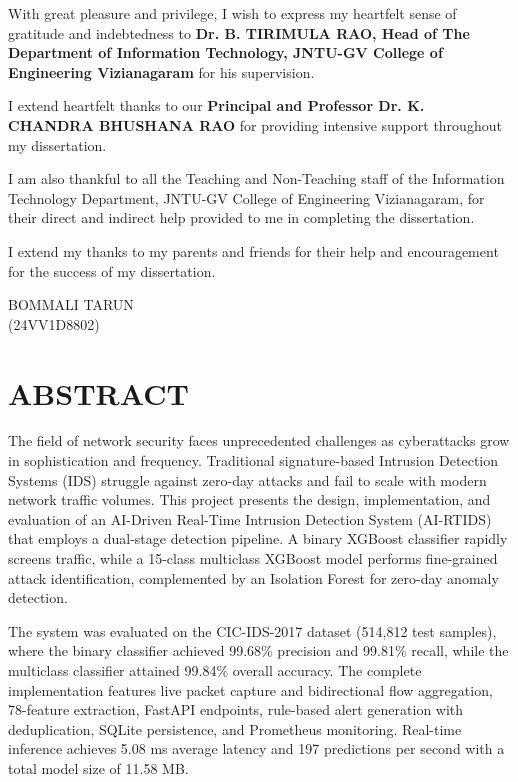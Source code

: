 \documentclass[12pt,a4paper]{report}
\newcommand{\centeredchapter}[1]{%
  \bgroup
  \titleformat{\chapter}[display]{\bfseries\Large\centering}{}{0pt}{\Large}%
  \chapter*{#1}%
  \egroup
}
\begin{document}
With great pleasure and privilege, I wish to express my heartfelt
sense of gratitude and indebtedness to
\textbf{Dr. B. TIRIMULA RAO, Head of The
Department of Information Technology, JNTU-GV College of Engineering
Vizianagaram} for his supervision.

I extend heartfelt thanks to our \textbf{Principal and Professor
Dr. K. CHANDRA BHUSHANA RAO} for providing intensive support throughout
my dissertation.

I am also thankful to all the Teaching and Non-Teaching staff of the
Information Technology Department, JNTU-GV College of Engineering
Vizianagaram, for their direct and indirect help provided to me in
completing the dissertation.

I extend my thanks to my parents and friends for their help and
encouragement for the success of my dissertation.

\vspace{0.05in}
\begin{flushright}
BOMMALI TARUN\\[0.5em]
(24VV1D8802)
\end{flushright}

\newpage
\centeredchapter{ABSTRACT}
\justifying

The field of network security faces unprecedented challenges as cyberattacks grow in sophistication and frequency. Traditional signature-based Intrusion Detection Systems (IDS) struggle against zero-day attacks and fail to scale with modern network traffic volumes. This project presents the design, implementation, and evaluation of an AI-Driven Real-Time Intrusion Detection System (AI-RTIDS) that employs a dual-stage detection pipeline. A binary XGBoost classifier rapidly screens traffic, while a 15-class multiclass XGBoost model performs fine-grained attack identification, complemented by an Isolation Forest for zero-day anomaly detection.

The system was evaluated on the CIC-IDS-2017 dataset (514,812 test samples), where the binary classifier achieved 99.68\% precision and 99.81\% recall, while the multiclass classifier attained 99.84\% overall accuracy. The complete implementation features live packet capture and bidirectional flow aggregation, 78-feature extraction, FastAPI endpoints, rule-based alert generation with deduplication, SQLite persistence, and Prometheus monitoring. Real-time inference achieves 5.08 ms average latency and 197 predictions per second with a total model size of 11.58 MB.
\end{document}
